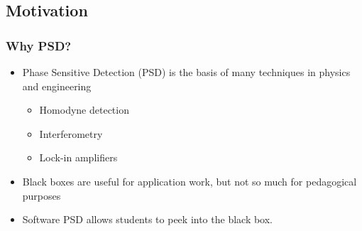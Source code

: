 \documentclass{beamer}
\begin{document}
\subsection{Motivation}
\begin{frame}
\frametitle{Why PSD?}
\begin{itemize}[<+-| alert@+>]
\item{Phase Sensitive Detection (PSD) is the basis of many techniques in physics and engineering}
\begin{itemize}
\item{Homodyne detection}
\item{Interferometry}
\item{Lock-in amplifiers}

\end{itemize}

\item {Black boxes are useful for application work, but not so much for pedagogical purposes}
\item {Software PSD allows students to peek into the black box.}


\end{itemize}

\end{frame}
\end{document}

